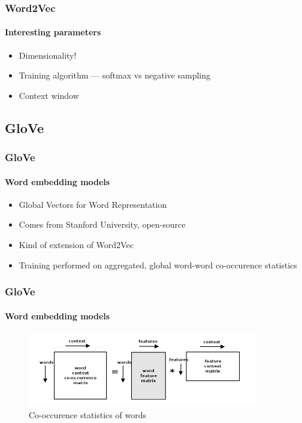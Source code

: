 \begin{frame}
\frametitle{Word2Vec}
	\framesubtitle{Interesting parameters}

	\begin{itemize}
		\item Dimensionality!
		\item Training algorithm --- softmax vs negative sampling
		\item Context window
	\end{itemize}

\end{frame}


\subsection{GloVe}


\begin{frame}
\frametitle{GloVe}
	\framesubtitle{Word embedding models}

	\begin{itemize}
		\item Global Vectors for Word Representation
		\item Comes from Stanford University, open-source
		\item Kind of extension of Word2Vec
		\item Training performed on aggregated, global word-word co-occurence statistics
	\end{itemize}

\end{frame}

\begin{frame}
\frametitle{GloVe}
	\framesubtitle{Word embedding models}

	\begin{figure}
		\includegraphics[width=10cm]{./figures/glove}
		\caption{Co-occurence statistics of words}
	\end{figure}

\end{frame}


